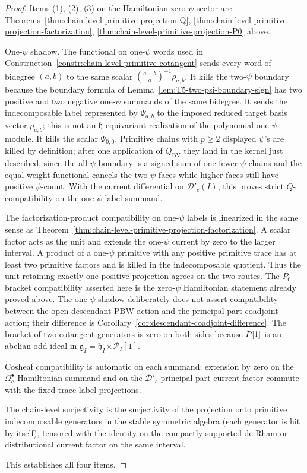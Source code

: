 \begin{proof}
  Items (1), (2), (3) on the Hamiltonian zero-$\psi$ sector are
  Theorems~\ref{thm:chain-level-primitive-projection-Q},
  \ref{thm:chain-level-primitive-projection-factorization},
  \ref{thm:chain-level-primitive-projection-P0} above.

  One-$\psi$ shadow.  The functional on one-\(\psi\) words used in
  Construction~\ref{constr:chain-level-primitive-cotangent} sends every
  word of bidegree \((a,b)\) to the same scalar
  \(\binom{a+b}{a}^{-1}\rho_{a,b}\).  It kills the two-\(\psi\) boundary
  because the boundary formula of
  Lemma~\ref{lem:T5-two-psi-boundary-sign} has two positive and two
  negative one-\(\psi\) summands of the same bidegree.  It sends
  the indecomposable label represented by \(\Psi_{a,b}\) to the imposed
  reduced target basis vector \(\rho_{a,b}\); this is not an
  \(\mathfrak h\)-equivariant realization of the polynomial one-\(\psi\)
  module.  It kills the scalar
  \(\Psi_{0,0}\).  Primitive chains with \(p\ge2\) displayed
  \(\psi\)'s are killed by definition; after one application of
  \(Q_{\mathrm{BV}}\) they land in the kernel just described, since the
  all-\(\psi\) boundary is a signed sum of one fewer \(\psi\)-chains and
  the equal-weight functional cancels the two-\(\psi\) faces while higher
  faces still have positive \(\psi\)-count.  With the current
  differential on \(\mathcal D'_c(I)\), this proves strict
  \(Q\)-compatibility on the one-\(\psi\) label summand.

  The factorization-product compatibility on one-\(\psi\) labels is
  linearized in the same sense as
  Theorem~\ref{thm:chain-level-primitive-projection-factorization}.  A
  scalar factor acts as the unit and extends the one-\(\psi\) current by
  zero to the larger interval.  A product of a one-\(\psi\) primitive with
  any positive primitive trace has at least two primitive factors and is
  killed in the indecomposable quotient.  Thus the unit-retaining
  exactly-one-positive projection agrees on the two routes.  The
	  $P_0$-bracket compatibility asserted here is the zero-$\psi$
	  Hamiltonian statement already proved above. The one-$\psi$ shadow
	  deliberately does not assert compatibility between the open
	  descendant PBW action and the principal-part coadjoint action;
	  their difference is
	  Corollary~\ref{cor:descendant-coadjoint-difference}. The
	  bracket of two cotangent generators is zero on both sides because
	  $P[1]$ is an abelian odd ideal in
  $\mathfrak g_I=\mathfrak h_I\ltimes\mathcal P_I[1]$.

	  Cosheaf compatibility is automatic on each summand: extension by zero
	  on the \(\Omega^\bullet_c\) Hamiltonian summand and on the
	  \(\mathcal D'_c\) principal-part current factor commute with the fixed
	  trace-label projections.

  The chain-level surjectivity is the surjectivity of the projection onto
  primitive indecomposable generators in the stable symmetric algebra
  (each generator is hit by itself), tensored with the identity on the
	  compactly supported de Rham or distributional current factor on the
	  same interval.

  This establishes all four items.
\end{proof}


